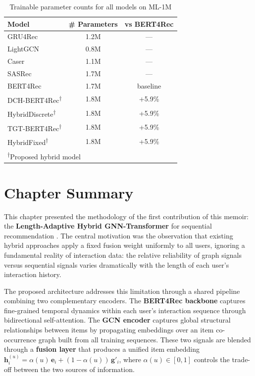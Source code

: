 \documentclass[12pt,a4paper]{report}
\newcommand{\parencite}[1]{\citep{#1}}
\begin{document}
\begin{table}[h]
\centering
\caption{Trainable parameter counts for all models on ML-1M}
\label{tab:params}
\renewcommand{\arraystretch}{1.3}
\small
\begin{tabular}{lcc}
\toprule
\textbf{Model} & \textbf{\# Parameters} & \textbf{vs BERT4Rec} \\
\midrule
GRU4Rec                  & 1.2M & --- \\
LightGCN                 & 0.8M & --- \\
Caser                    & 1.1M & --- \\
SASRec                   & 1.7M & --- \\
BERT4Rec                 & 1.7M & baseline \\
\midrule
DCH-BERT4Rec\textsuperscript{†}    & 1.8M & +5.9\% \\
HybridDiscrete\textsuperscript{†}  & 1.8M & +5.9\% \\
TGT-BERT4Rec\textsuperscript{†}    & 1.8M & +5.9\% \\
HybridFixed\textsuperscript{†}     & 1.8M & +5.9\% \\
\bottomrule
\multicolumn{3}{l}{\textsuperscript{†}Proposed hybrid model}
\end{tabular}
\end{table}

\section{Chapter Summary}

This chapter presented the methodology of the first contribution
of this memoir: the \textbf{Length-Adaptive Hybrid GNN-Transformer}
for sequential recommendation \parencite{ouledmeriem2025hybrid}.
The central motivation was the observation that existing hybrid
approaches apply a fixed fusion weight uniformly to all users,
ignoring a fundamental reality of interaction data: the relative
reliability of graph signals versus sequential signals varies
dramatically with the length of each user's interaction history.

The proposed architecture addresses this limitation through a
shared pipeline combining two complementary encoders. The
\textbf{BERT4Rec backbone} captures fine-grained temporal
dynamics within each user's interaction sequence through
bidirectional self-attention. The \textbf{GCN encoder} captures
global structural relationships between items by propagating
embeddings over an item co-occurrence graph built from all
training sequences. These two signals are blended through a
\textbf{fusion layer} that produces a unified item embedding
$\mathbf{h}_i^{(u)} = \alpha(u)\,\mathbf{e}_i +
(1-\alpha(u))\,\mathbf{g}'_i$, where $\alpha(u) \in [0,1]$
controls the trade-off between the two sources of information.
\end{document}
